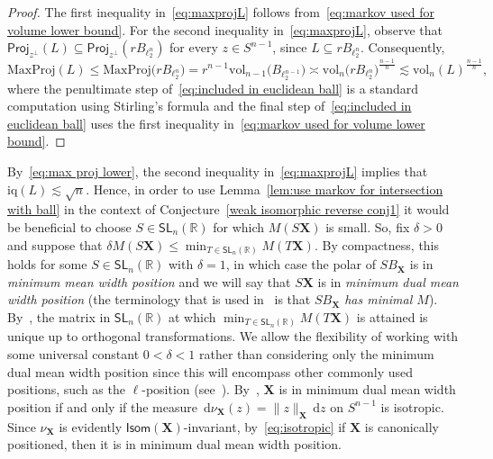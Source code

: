 \documentclass[11pt,reqno]{amsart}
\renewcommand{\le}{\leqslant}
\newcommand{\ud}[0]{\,\mathrm{d}}
\renewcommand{\d}{\delta}
\newcommand{\proj}{\mathsf{Proj}}
\newcommand{\X}{\mathbf X}
\newcommand{\R}{\mathbb R}
\theoremstyle{remark}
\newcommand{\iq}{\mathrm{iq}}
\newcommand{\SL}{\mathsf{SL}}
\renewcommand{\subset}{\subseteq}
\newcommand{\vol}{\mathrm{vol}}
\renewcommand{\1}{\mathbf 1}
\begin{document}
\begin{proof} The first inequality in~\eqref{eq:maxprojL} follows from~\eqref{eq:markov used for volume lower bound}. For the second inequality in~\eqref{eq:maxprojL}, observe that $\proj_{z^\perp}(L)\subset \proj_{z^\perp} (rB_{\ell_2^{n}})$ for every $z\in S^{n-1}$, since $L\subset rB_{\ell_2^n}$. Consequently,
 \begin{equation}\label{eq:included in euclidean ball}\mathrm{MaxProj}(L)\le \mathrm{MaxProj}\big(rB_{\ell_2^n}\big)=r^{n-1} \vol_{n-1}\big(B_{\ell_2^{n-1}}\big)\asymp \vol_n\big(rB_{\ell_2^n}\big)^{\frac{n-1}{n}}\lesssim \vol_n(L)^{\frac{n-1}{n}},
\end{equation}
where the penultimate step of~\eqref{eq:included in euclidean ball} is a standard computation using Stirling's formula and the final step of~\eqref{eq:included in euclidean ball} uses the first inequality in~\eqref{eq:markov used for volume lower bound}.
\end{proof}

By~\eqref{eq:max proj lower}, the second inequality in~\eqref{eq:maxprojL} implies that $\iq(L)\lesssim \sqrt{n}$.  Hence, in order to use Lemma~\ref{lem:use markov for intersection with ball} in the context of Conjecture~\ref{weak isomorphic reverse conj1} it would  be beneficial  to choose $S\in \SL_n(\R)$ for which $M(S\X)$ is small. So, fix $\d>0$ and suppose  that $\d M(S\X)\le \min_{T\in \SL_n(\R)}M(T\X)$. By compactness, this holds for some $S\in \SL_n(\R)$ with $\d=1$, in which case the polar of $SB_\X$ is in {\em minimum mean width position} and we will say that $S\X$ is in {\em minimum dual mean width position} (the terminology that is used in~\cite{GMR00} is that $SB_\X$ {\em has minimal $M$}). By~\cite{GM00}, the matrix in $\SL_n(\R)$  at which $\min_{T\in \SL_n(\R)} M(T\X)$ is attained is unique up to orthogonal transformations. We  allow the flexibility of working with some universal constant $0<\d<1$ rather than considering only  the minimum dual mean width position since this will encompass other commonly used positions, such as the $\ell$-position (see~\cite[Section~1.11]{BGVV14}). By~\cite{GM00}, $\X$ is in minimum dual mean width position  if and only if the  measure $\ud \nu_\X(z)=\|z\|_\X\ud z$ on $S^{n-1}$  is isotropic. Since $\nu_\X$ is evidently $\mathsf{Isom}(\X)$-invariant, by~\eqref{eq:isotropic}  if $\X$ is canonically positioned, then it is in minimum dual mean width position.
\end{document}
